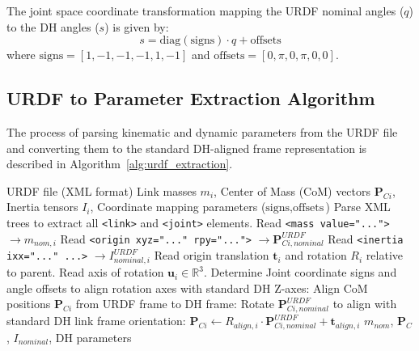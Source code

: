 \documentclass[journal]{IEEEtran}
\begin{document}
The joint space coordinate transformation mapping the URDF nominal angles ($q$) to the DH angles ($s$) is given by:
\begin{equation}
    s = \text{diag}(\text{signs}) \cdot q + \text{offsets}
\end{equation}
where $\text{signs} = [1, -1, -1, -1, 1, -1]$ and $\text{offsets} = [0, \pi, 0, \pi, 0, 0]$.

\subsection{URDF to Parameter Extraction Algorithm}
The process of parsing kinematic and dynamic parameters from the URDF file and converting them to the standard DH-aligned frame representation is described in Algorithm~\ref{alg:urdf_extraction}.

\begin{algorithm}[h]
\caption{URDF to Parameter Extraction and Alignment}
\label{alg:urdf_extraction}
\begin{algorithmic}[1]
\REQUIRE URDF file (XML format)
\ENSURE Link masses $m_i$, Center of Mass (CoM) vectors $\textbf{P}_{Ci}$, Inertia tensors $I_i$, Coordinate mapping parameters ($\text{signs}, \text{offsets}$)
\STATE Parse XML trees to extract all \verb|<link>| and \verb|<joint>| elements.
    \STATE Read \verb|<mass value="...">| $\rightarrow m_{nom, i}$
    \STATE Read \verb|<origin xyz="..." rpy="...">| $\rightarrow \textbf{P}_{Ci, nominal}^{URDF}$
    \STATE Read \verb|<inertia ixx="..." ...>| $\rightarrow I_{nominal, i}^{URDF}$
\ENDFOR
{}
    \STATE Read origin translation $\textbf{t}_i$ and rotation $R_i$ relative to parent.
    \STATE Read axis of rotation $\textbf{u}_i \in \mathbb{R}^3$.
\ENDFOR
\STATE Determine Joint coordinate signs and angle offsets to align rotation axes with standard DH Z-axes:
\STATE Align CoM positions $\textbf{P}_{Ci}$ from URDF frame to DH frame:
    \STATE Rotate $\textbf{P}_{Ci, nominal}^{URDF}$ to align with standard DH link frame orientation:
    \STATE $\textbf{P}_{Ci} \leftarrow R_{align, i} \cdot \textbf{P}_{Ci, nominal}^{URDF} + \textbf{t}_{align, i}$
\ENDFOR
\RETURN $m_{nom}$, $\textbf{P}_{C}$, $I_{nominal}$, DH parameters
\end{algorithmic}
\end{algorithm}
\end{document}
